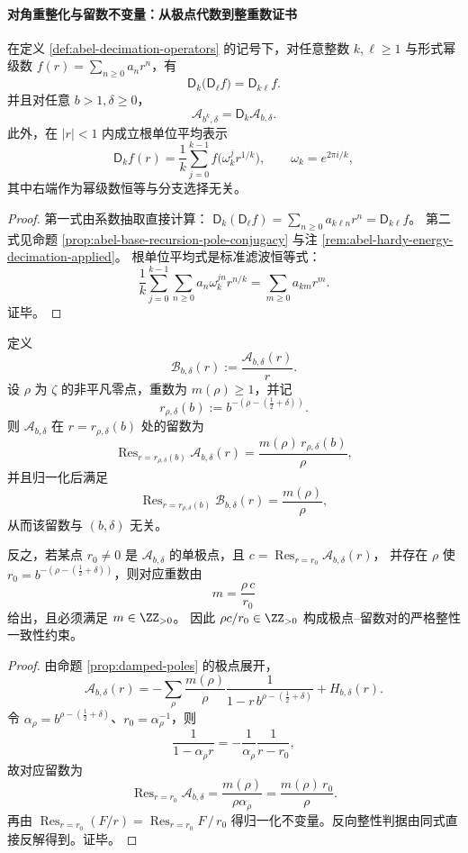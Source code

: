 \paragraph{对角重整化与留数不变量：从极点代数到整重数证书}

\begin{proposition}[抽取重整化算子的半群恒等式]\label{prop:abel-decimation-semigroup-identity}
在定义 \ref{def:abel-decimation-operators} 的记号下，对任意整数 \(k,\ell\ge 1\) 与形式幂级数 \(f(r)=\sum_{n\ge 0}a_n r^n\)，有
\[
\mathsf D_k\!\bigl(\mathsf D_\ell f\bigr)=\mathsf D_{k\ell}f.
\]
并且对任意 \(b>1,\delta\ge 0\)，
\[
\mathcal A_{b^k,\delta}=\mathsf D_k\mathcal A_{b,\delta}.
\]
此外，在 \(|r|<1\) 内成立根单位平均表示
\[
\mathsf D_k f(r)=\frac1k\sum_{j=0}^{k-1}f\!\bigl(\omega_k^j r^{1/k}\bigr),
\qquad
\omega_k=e^{2\pi i/k},
\]
其中右端作为幂级数恒等与分支选择无关。
\end{proposition}
\begin{proof}
第一式由系数抽取直接计算：
\(
\mathsf D_k(\mathsf D_\ell f)=\sum_{n\ge 0}a_{k\ell n}r^n=\mathsf D_{k\ell}f
\)。
第二式见命题 \ref{prop:abel-base-recursion-pole-conjugacy} 与注 \ref{rem:abel-hardy-energy-decimation-applied}。
根单位平均式是标准滤波恒等式：
\[
\frac1k\sum_{j=0}^{k-1}\sum_{n\ge 0}a_n\omega_k^{jn}r^{n/k}
=\sum_{m\ge 0}a_{km}r^m.
\]
证毕。
\end{proof}

\begin{proposition}[归一化留数不变量与整重数一致性证书]\label{prop:abel-normalized-residue-invariant-integrality}
定义
\[
\mathcal B_{b,\delta}(r):=\frac{\mathcal A_{b,\delta}(r)}{r}.
\]
设 \(\rho\) 为 \(\zeta\) 的非平凡零点，重数为 \(m(\rho)\ge 1\)，并记
\[
r_{\rho,\delta}(b):=b^{-(\rho-(\frac12+\delta))}.
\]
则 \(\mathcal A_{b,\delta}\) 在 \(r=r_{\rho,\delta}(b)\) 处的留数为
\[
\operatorname{Res}_{r=r_{\rho,\delta}(b)}\mathcal A_{b,\delta}(r)
=\frac{m(\rho)\,r_{\rho,\delta}(b)}{\rho},
\]
并且归一化后满足
\[
\boxed{\;
\operatorname{Res}_{r=r_{\rho,\delta}(b)}\mathcal B_{b,\delta}(r)=\frac{m(\rho)}{\rho},
\;}
\]
从而该留数与 \((b,\delta)\) 无关。
\par
反之，若某点 \(r_0\neq 0\) 是 \(\mathcal A_{b,\delta}\) 的单极点，且
\(
c=\operatorname{Res}_{r=r_0}\mathcal A_{b,\delta}(r)
\)，
并存在 \(\rho\) 使 \(r_0=b^{-(\rho-(\frac12+\delta))}\)，则对应重数由
\[
m=\frac{\rho\,c}{r_0}
\]
给出，且必须满足 \(m\in\ZZ_{>0}\)。
因此 \(\rho c/r_0\in\ZZ_{>0}\) 构成极点--留数对的严格整性一致性约束。
\end{proposition}
\begin{proof}
由命题 \ref{prop:damped-poles} 的极点展开，
\[
\mathcal A_{b,\delta}(r)
=-\sum_\rho \frac{m(\rho)}{\rho}\frac1{1-r\,b^{\rho-(\frac12+\delta)}}+H_{b,\delta}(r).
\]
令 \(\alpha_\rho=b^{\rho-(\frac12+\delta)}\)、\(r_0=\alpha_\rho^{-1}\)，则
\[
\frac1{1-\alpha_\rho r}=-\frac1{\alpha_\rho}\frac1{r-r_0},
\]
故对应留数为
\[
\operatorname{Res}_{r=r_0}\mathcal A_{b,\delta}
=\frac{m(\rho)}{\rho\alpha_\rho}
=\frac{m(\rho)\,r_0}{\rho}.
\]
再由
\(
\operatorname{Res}_{r=r_0}(F/r)=\operatorname{Res}_{r=r_0}F\,/\,r_0
\)
得归一化不变量。反向整性判据由同式直接反解得到。证毕。
\end{proof}

